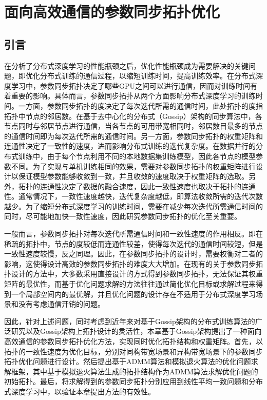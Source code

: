 \chapter{面向高效通信的参数同步拓扑优化}
\section{引言}

在分析了分布式深度学习的性能瓶颈之后，优化性能瓶颈成为需要解决的关键问题，即优化分布式训练的通信过程，以缩短训练时间，提高训练效率。在分布式深度学习中，参数同步拓扑决定了哪些GPU之间可以进行通信，因而对训练时间有着重要的影响。具体而言，参数同步拓扑从两个方面影响分布式深度学习的训练时间。一方面，参数同步拓扑的度决定了每次迭代所需的通信时间，此处拓扑的度指拓扑中节点的邻居数。在基于去中心化的分布式（Gossip）架构的同步算法中，各节点同时与邻居节点进行通信，当各节点的可用带宽相同时，邻居数目最多的节点的通信时间即为每次迭代所需的通信时间。另一方面，参数同步拓扑的权重矩阵和连通性决定了一致性的速度，进而影响分布式训练的迭代复杂度。在数据并行的分布式训练中，由于每个节点利用不同的本地数据集训练模型，因此各节点的模型参数不同。为了实现与单机训练相同的效果，需要对参数同步拓扑的权重矩阵进行设计以保证模型参数能够收敛到一致，并且收敛的速度取决于权重矩阵的选取。另外，拓扑的连通性决定了数据的融合速度，因此一致性速度也取决于拓扑的连通性。通常情况下，一致性速度越快，迭代复杂度越低，即算法收敛所需的迭代次数越少。为了缩短分布式深度学习的训练时间，需要在减少每次迭代所需通信时间的同时，尽可能地加快一致性速度，因此研究参数同步拓扑的优化至关重要。

一般而言，参数同步拓扑对每次迭代所需通信时间和一致性速度的作用相反。即在稀疏的拓扑中，节点的度较低而连通性较差，使得每次迭代的通信时间较短，但是一致性速度较慢，反之同理。因此，在参数同步拓扑的设计时，需要权衡对二者的影响，这使得设计高效的参数同步拓扑的难度大大增加。在现有的关于参数同步拓扑设计的方法中，大多数采用直接设计的方式得到参数同步拓扑，无法保证其权重矩阵的最优性，而基于优化问题求解的方法往往通过简化优化目标或求解过程来得到一个局部空间内的最优解，并且优化问题的设计存在不适用于分布式深度学习场景和没有考虑通信开销的问题。

因此，针对上述问题，同时考虑到近年来对基于Gossip架构的分布式训练算法的广泛研究以及Gossip架构上拓扑设计的灵活性，本章基于Gossip架构提出了一种面向高效通信的参数同步拓扑优化方法，实现同时优化拓扑结构和权重矩阵。首先，以拓扑的一致性速度为优化目标，分别对同构带宽场景和异构带宽场景下的参数同步拓扑优化问题进行设计。然后提出基于ADMM算法和模拟退火算法的优化问题求解框架，其中基于模拟退火算法生成的拓扑结构作为ADMM算法求解优化问题的初始拓扑。最后，将求解得到的参数同步拓扑分别应用到线性平均一致问题和分布式深度学习中，以验证本章提出方法的有效性。

